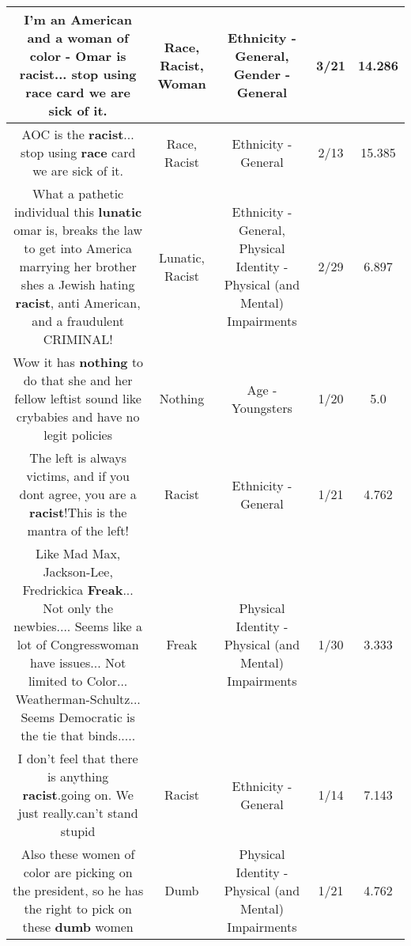 \documentclass[11pt]{article}
\newlength\mylength
\begin{document}
\begin{center}
\begin{longtable}{|C{.65\mylength}|C{.30\mylength}|C{.12\mylength}|C{.12\mylength}|C{.12\mylength}|}
  \small I'm an American and a \textbf{woman} of color - Omar is \textbf{racist}... stop using \textbf{race} card we are sick of it.\normalsize   & Race, Racist, Woman & Ethnicity - General, Gender - General & 3/21 & 14.286 \\  \hline
  \small AOC is the \textbf{racist}... stop using \textbf{race} card we are sick of it.\normalsize   & Race, Racist & Ethnicity - General & 2/13 & 15.385 \\  \hline
  \small What a pathetic individual this \textbf{lunatic} omar is, breaks the law to get into America marrying her brother shes a Jewish hating \textbf{racist}, anti American, and a fraudulent CRIMINAL!\normalsize   & Lunatic, Racist & Ethnicity - General, Physical Identity - Physical (and Mental) Impairments & 2/29 & 6.897 \\  \hline
  \small Wow it has \textbf{nothing} to do that she and her fellow leftist sound like crybabies and have no legit policies\normalsize   & Nothing & Age - Youngsters & 1/20 & 5.0 \\  \hline
  \small The left is always victims, and if you dont agree, you are a \textbf{racist}!This is the mantra of the left!\normalsize   & Racist & Ethnicity - General & 1/21 & 4.762 \\  \hline
  \small Like Mad Max, Jackson-Lee, Fredrickica \textbf{Freak}... Not only the newbies.... Seems like a lot of Congresswoman have issues... Not limited to Color... Weatherman-Schultz...   Seems Democratic is the tie that binds.....\normalsize   & Freak & Physical Identity - Physical (and Mental) Impairments & 1/30 & 3.333 \\  \hline
  \small I don't feel that there is anything \textbf{racist}.going on.  We just really.can't stand stupid\normalsize   & Racist & Ethnicity - General & 1/14 & 7.143 \\  \hline
  \small Also these women of color are picking on the president, so he has the right to pick on these \textbf{dumb} women\normalsize   & Dumb & Physical Identity - Physical (and Mental) Impairments & 1/21 & 4.762 \\  \hline

\end{longtable}
\end{center}
\end{document}
